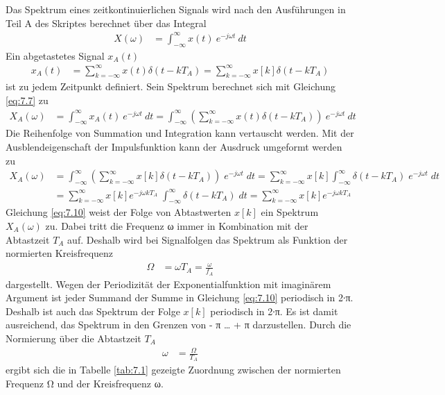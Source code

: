 Das Spektrum eines zeitkontinuierlichen Signals wird nach den Ausführungen in Teil A des Skriptes berechnet über das Integral
\begin{align}
X(\omega) &= \int_{- \infty}^{\infty}{x(t)  \ }e^{- j  \omega  t}\ dt \label{eq:7.7}
\end{align}
Ein abgetastetes Signal \(x_{A}(t)\)
\begin{align}
x_{A}(t) &= \sum\limits_{k = - \infty}^{\infty}{x(t)  \delta\left( t - k  T_{A} \right)} = \sum\limits_{k = - \infty}^{\infty}{x[ k]  \delta\left( t - k  T_{A} \right)} \label{eq:7.8}
\end{align}
ist zu jedem Zeitpunkt definiert. Sein Spektrum berechnet sich mit Gleichung \eqref{eq:7.7} zu
\begin{align}
X_{A}(\omega) &= \int_{- \infty}^{\infty}{x_{A}(t)  \ }e^{- j  \omega  t}\ dt = \int_{- \infty}^{\infty}{\left( \sum\limits_{k = - \infty}^{\infty}{x(t)  \delta\left( t - k  T_{A} \right)} \right)  \ }e^{- j  \omega  t}\ dt \label{eq:7.9}
\end{align}
Die Reihenfolge von Summation und Integration kann vertauscht werden. Mit der Ausblendeigenschaft der Impulsfunktion kann der Ausdruck umgeformt werden zu
\begin{align}
{X_{A} \left(\omega \right)} &=  {\int _{-\infty }^{\infty }\left(\sum\limits _{k=-\infty }^{\infty }x\left[k\right] \delta \left(t-k T_{A} \right) \right) {\; } e^{-j \omega  t} {\; }dt=\sum\limits _{k=-\infty }^{\infty }x\left[k\right] \int _{-\infty }^{\infty }\delta \left(t-k T_{A} \right) {\; } e^{-j \omega  t} {\; }dt } \\
{} &=  {\sum\limits _{k=-\infty }^{\infty }x\left[k\right] e^{-j \omega  k T_{A} }  {\; } \int _{-\infty }^{\infty }\delta \left(t-k T_{A} \right){\; } dt=\sum\limits _{k=-\infty }^{\infty }x\left[k\right] e^{-j \omega  k T_{A} }  }
\label{eq:7.10}
\end{align}
Gleichung \eqref{eq:7.10} weist der Folge von Abtastwerten \(x[k]\) ein Spektrum \(X_{A}(ω)\) zu. Dabei tritt die Frequenz ω immer in Kombination mit der Abtastzeit \(T_{A}\) auf. Deshalb wird bei Signalfolgen das Spektrum als Funktion der normierten Kreisfrequenz
\begin{align}
\Omega &= \omega  T_{A} = \frac{\omega}{f_{A}} \label{eq:7.11}
\end{align}
dargestellt. Wegen der Periodizität der Exponentialfunktion mit imaginärem Argument ist jeder Summand der Summe in Gleichung \eqref{eq:7.10} periodisch in 2∙π. Deshalb ist auch das Spektrum der Folge \(x[k]\) periodisch in 2∙π. Es ist damit ausreichend, das Spektrum in den Grenzen von - π \ldots{} + π darzustellen. Durch die Normierung über die Abtastzeit \(T_{A}\)
\begin{align}
\omega &= \frac{\Omega}{T_{A}} \label{eq:7.12}
\end{align}
ergibt sich die in Tabelle \ref{tab:7.1} gezeigte Zuordnung zwischen der normierten Frequenz Ω und der Kreisfrequenz ω.

